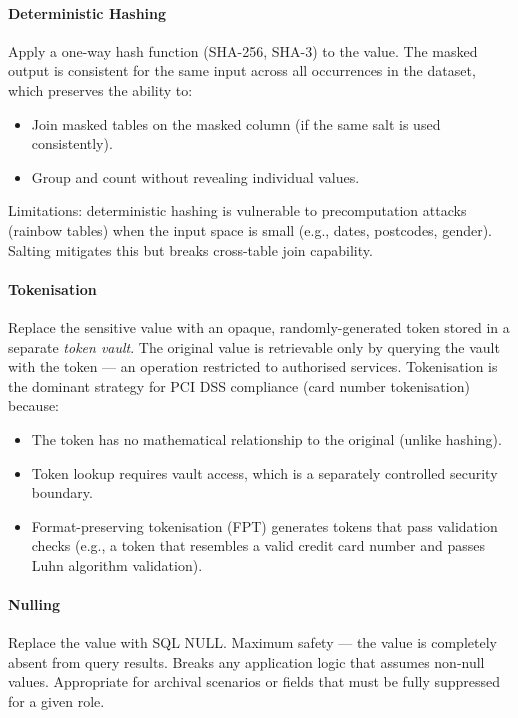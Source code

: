 \paragraph{Deterministic Hashing}

Apply a one-way hash function (SHA-256, SHA-3) to the value. The masked output is consistent for the same input across all occurrences in the dataset, which preserves the ability to:
\begin{itemize}
    \item Join masked tables on the masked column (if the same salt is used consistently).
    \item Group and count without revealing individual values.
\end{itemize}
Limitations: deterministic hashing is vulnerable to precomputation attacks (rainbow tables) when the input space is small (e.g., dates, postcodes, gender). Salting mitigates this but breaks cross-table join capability.

\paragraph{Tokenisation}

Replace the sensitive value with an opaque, randomly-generated token stored in a separate \emph{token vault}. The original value is retrievable only by querying the vault with the token — an operation restricted to authorised services. Tokenisation is the dominant strategy for PCI DSS compliance (card number tokenisation) because:
\begin{itemize}
    \item The token has no mathematical relationship to the original (unlike hashing).
    \item Token lookup requires vault access, which is a separately controlled security boundary.
    \item Format-preserving tokenisation (FPT) generates tokens that pass validation checks (e.g., a token that resembles a valid credit card number and passes Luhn algorithm validation).
\end{itemize}

\paragraph{Nulling}

Replace the value with SQL NULL. Maximum safety — the value is completely absent from query results. Breaks any application logic that assumes non-null values. Appropriate for archival scenarios or fields that must be fully suppressed for a given role.

